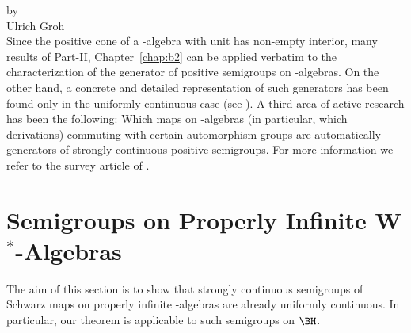 \label{chap:d2}
\thispagestyle{empty}
{\Large
\vspace*{-.75cm}
by \\[.25em]
Ulrich Groh
\vspace{.75cm}
\\
}
Since the positive cone of a \CA-algebra with unit has non-empty interior, many results of Part-II, Chapter~\ref{chap:b2} can be applied verbatim to the characterization of the generator of positive semigroups on \CA-algebras.
On the other hand, a concrete and detailed representation of such generators has been found only in the uniformly continuous case (see \textcite{lindblad:1976}).
A third area of active research has been the following: Which maps on \CA-algebras (in particular, which derivations) commuting with certain automorphism groups are automatically generators of strongly continuous positive semigroups.
For more information we refer to the survey article of \textcite{evans:1984}.
\section{Semigroups on Properly Infinite \texorpdfstring{W$^{*}$-Algebras}{W*-Algebras}}
The aim of this section is to show that strongly continuous semigroups of Schwarz maps on properly infinite \WA-algebras are already uniformly continuous.
In particular, our theorem is applicable to such semigroups on $\BH$.

